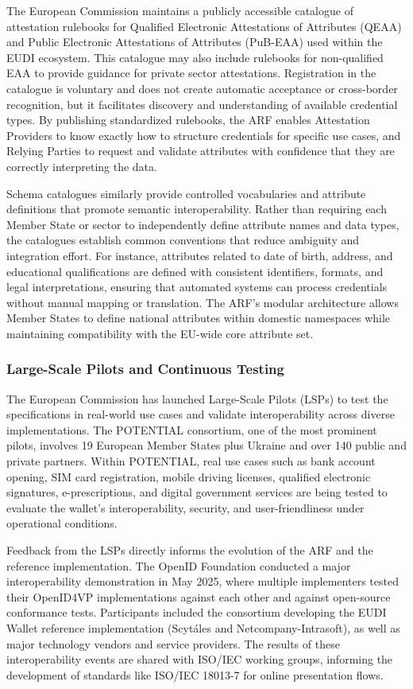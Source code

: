 \documentclass[sigconf,balance,nonacm,authordraft]{acmart}
\begin{document}
The European Commission maintains a publicly accessible catalogue of attestation rulebooks for Qualified Electronic Attestations of Attributes (QEAA) and Public Electronic Attestations of Attributes (PuB-EAA) used within the EUDI ecosystem. This catalogue may also include rulebooks for non-qualified EAA to provide guidance for private sector attestations. Registration in the catalogue is voluntary and does not create automatic acceptance or cross-border recognition, but it facilitates discovery and understanding of available credential types. By publishing standardized rulebooks, the ARF enables Attestation Providers to know exactly how to structure credentials for specific use cases, and Relying Parties to request and validate attributes with confidence that they are correctly interpreting the data.

Schema catalogues similarly provide controlled vocabularies and attribute definitions that promote semantic interoperability. Rather than requiring each Member State or sector to independently define attribute names and data types, the catalogues establish common conventions that reduce ambiguity and integration effort. For instance, attributes related to date of birth, address, and educational qualifications are defined with consistent identifiers, formats, and legal interpretations, ensuring that automated systems can process credentials without manual mapping or translation. The ARF's modular architecture allows Member States to define national attributes within domestic namespaces while maintaining compatibility with the EU-wide core attribute set.

\subsubsection{Large-Scale Pilots and Continuous Testing}

The European Commission has launched Large-Scale Pilots (LSPs) to test the specifications in real-world use cases and validate interoperability across diverse implementations. The POTENTIAL consortium, one of the most prominent pilots, involves 19 European Member States plus Ukraine and over 140 public and private partners. Within POTENTIAL, real use cases such as bank account opening, SIM card registration, mobile driving licenses, qualified electronic signatures, e-prescriptions, and digital government services are being tested to evaluate the wallet's interoperability, security, and user-friendliness under operational conditions.

Feedback from the LSPs directly informs the evolution of the ARF and the reference implementation. The OpenID Foundation conducted a major interoperability demonstration in May 2025, where multiple implementers tested their OpenID4VP implementations against each other and against open-source conformance tests. Participants included the consortium developing the EUDI Wallet reference implementation (Scytáles and Netcompany-Intrasoft), as well as major technology vendors and service providers. The results of these interoperability events are shared with ISO/IEC working groups, informing the development of standards like ISO/IEC 18013-7 for online presentation flows.
\end{document}
